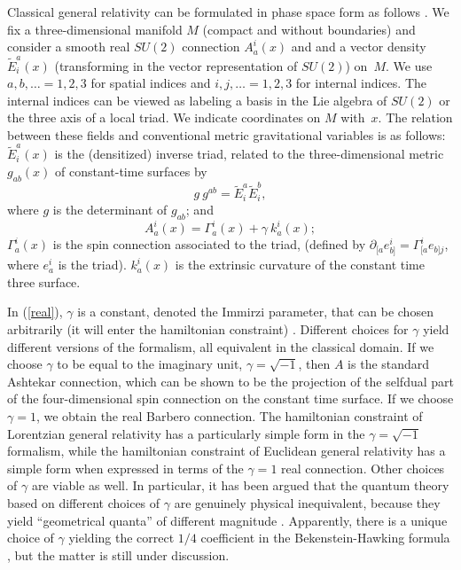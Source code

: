 Classical general relativity can be formulated in phase space 
form as follows \cite{AshtekarBook,Barbero3}.  We fix a 
three-dimensional manifold $M$ (compact and without boundaries) 
and consider a smooth real $SU(2)$ connection $A_a^i(x)$ and and 
a vector density $\tilde{E}^a_i(x)$ (transforming in the vector 
representation of $SU(2)$) on~$M$.  We use $a,b,\ldots=1,2,3$ for 
spatial indices and $i,j,\ldots=1,2,3$ for internal indices.  The 
internal indices can be viewed as labeling a basis in the Lie 
algebra of $SU(2)$ or the three axis of a local triad.  We 
indicate coordinates on $M$ with~$x$.  The relation between these 
fields and conventional metric gravitational variables is as 
follows: $\tilde{E}^a_i(x)$ is the (densitized) inverse triad, 
related to the three-dimensional metric $g_{ab}(x)$ of 
constant-time surfaces by 
%
 \begin{equation} 
 g\ g^{ab} = \tilde{E}^a_i\tilde{E}^b_i, 
 \end{equation} 
% 
 where $g$ is the determinant of $g_{ab}$; and 
% 
\begin{equation} 
A_a^i(x)=\Gamma_a^i(x)+ \gamma\ k_a^i(x); 
\label{real} 
\end{equation} 
$\Gamma_a^i(x)$ is the spin connection associated to the triad, 
(defined by $\partial_{[a}e_{b]}^{i}=\Gamma_{[a}^i e_{b]j}$, where 
$e_{a}^{i}$ is the triad).  $k_a^i(x)$ is the extrinsic curvature 
of the constant time three surface.  

In (\ref{real}), $\gamma$ is a constant, denoted the Immirzi 
parameter, that can be chosen arbitrarily (it will enter the 
hamiltonian constraint) \cite{Immirzi2,Immirzi3,Immirzi}.  
Different choices for $\gamma$ yield different versions of the 
formalism, all equivalent in the classical domain.  If we choose 
$\gamma$ to be equal to the imaginary unit, $\gamma=\sqrt{-1}$, 
then $A$ is the standard Ashtekar connection, which can be shown  
to be the projection of the selfdual part of the four-dimensional 
spin connection on the constant time surface.  If we choose 
$\gamma=1$, we obtain the real Barbero connection.  The 
hamiltonian constraint of Lorentzian general relativity has a 
particularly simple form in the $\gamma=\sqrt{-1}$ formalism, 
while the hamiltonian constraint of Euclidean general relativity 
has a simple form when expressed in terms of the $\gamma=1$ real 
connection.  Other choices of $\gamma$ are viable as well.  In 
particular, it has been argued that the quantum theory based on 
different choices of $\gamma$ are genuinely physical 
inequivalent, because they yield ``geometrical quanta'' of 
different magnitude \cite{RovelliThiemann}.  Apparently, there is 
a unique choice of $\gamma$ yielding the correct $1/4$ 
coefficient in the Bekenstein-Hawking formula 
\cite{Krasnov,Krasnov2,Rovelli96,AshtekarEtAl97,%
RovelliAscona,CorichiKrasnov}, 
but the matter is still under discussion.

